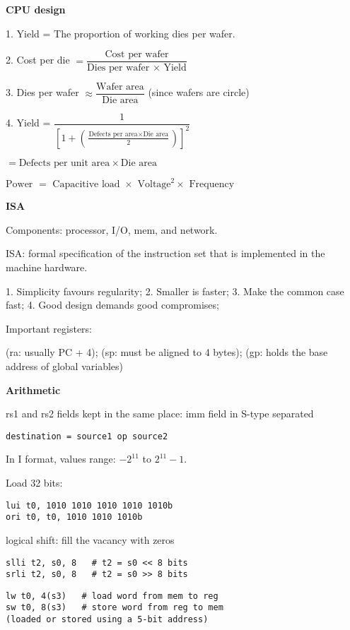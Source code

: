 \documentclass[10pt,landscape,a4paper]{article}
\begin{document}
\begin{multicols}{3}
\textbf{CPU design}

1. Yield = The proportion of working dies per wafer. 

2. Cost per die \(= \dfrac{\text{Cost per wafer}}{\text{Dies per wafer }\times\text{ Yield}}\) 

3. Dies per wafer \(\approx \dfrac{\text{Wafer area}}{\text{Die area}}\) (since wafers are circle)

4. Yield = \(\dfrac{1}{\left[1 + (\frac{\text{Defects per area} \times \text{Die area}}{2})\right]^2}\) 

\(= \text{Defects per unit area} \times \text{Die area}\)

\(\text{Power } = \text{ Capacitive load } \times \text{ Voltage}^2 \times \text{ Frequency}\) 

\textbf{ISA}

Components: processor, I/O, mem, and network.

ISA: formal specification of the instruction set that is implemented in the machine hardware. 

1. Simplicity favours regularity; 2. Smaller is faster; 3. Make the common case fast; 4. Good design demands good compromises; 

Important registers: 

(ra: usually PC + 4); (sp: must be aligned to 4 bytes); (gp: holds the base address of global variables)

\textbf{Arithmetic}

rs1 and rs2 fields kept in the same place: imm field in S-type separated
\begin{verbatim}
destination = source1 op source2
\end{verbatim}
In I format, values range: \(-2^{11}\) to \(2^{11} - 1\). 

Load 32 bits:
\begin{verbatim}
lui t0, 1010 1010 1010 1010 1010b
ori t0, t0, 1010 1010 1010b
\end{verbatim}

logical shift: fill the vacancy with zeros
\begin{verbatim}
slli t2, s0, 8   # t2 = s0 << 8 bits
srli t2, s0, 8   # t2 = s0 >> 8 bits
\end{verbatim}
\begin{verbatim}
lw t0, 4(s3)   # load word from mem to reg
sw t0, 8(s3)   # store word from reg to mem
(loaded or stored using a 5-bit address)
\end{verbatim}


\end{multicols}
\end{document}

